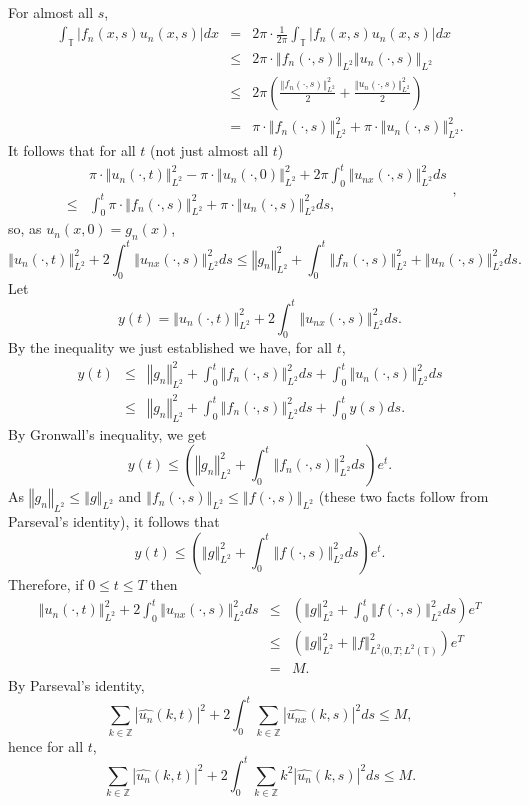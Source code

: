 \documentclass{article}
\newcommand{\norm}[1]{\left\Vert #1 \right\Vert}
\begin{document}
For almost all $s$,
\begin{eqnarray*}
 \int_\mathbb{T} |f_n(x,s) u_n(x,s)| dx &=& 
 2\pi \cdot \frac{1}{2\pi}  \int_\mathbb{T} |f_n(x,s) u_n(x,s)| dx\\
 & \leq& 
 2\pi \cdot \norm{f_n(\cdot,s)}_{L^2} \norm{u_n(\cdot,s)}_{L^2}\\
 &\leq&2\pi \left( \frac{ \norm{f_n(\cdot,s)}_{L^2}^2}{2} + \frac{\norm{u_n(\cdot,s)}_{L^2}^2}{2} \right)\\
 &=&\pi \cdot  \norm{f_n(\cdot,s)}_{L^2}^2 + \pi\cdot \norm{u_n(\cdot,s)}_{L^2}^2.
\end{eqnarray*}
It follows that for all $t$ (not just almost all $t$)
\[
\begin{split}
&\pi \cdot \norm{u_n(\cdot,t)}_{L^2}^2 - \pi \cdot \norm{u_n(\cdot,0)}_{L^2}^2
+ 2\pi \int_0^t \norm{u_{nx}(\cdot,s)}_{L^2}^2 ds\\
 \leq& \int_0^t \pi \cdot  \norm{f_n(\cdot,s)}_{L^2}^2 + \pi\cdot \norm{u_n(\cdot,s)}_{L^2}^2 ds,
 \end{split},
\]
so, as $u_n(x,0)=g_n(x)$,
\[
 \norm{u_n(\cdot,t)}_{L^2}^2+2 \int_0^t \norm{u_{nx}(\cdot,s)}_{L^2}^2 ds \leq  \norm{g_n}_{L^2}^2 +  \int_0^t  \norm{f_n(\cdot,s)}_{L^2}^2  + \norm{u_n(\cdot,s)}_{L^2}^2 ds.
\]
Let
\[
y(t)= \norm{u_n(\cdot,t)}_{L^2}^2+2 \int_0^t \norm{u_{nx}(\cdot,s)}_{L^2}^2 ds.
\]
By the inequality we just established we have, for all $t$,
\begin{eqnarray*}
y(t)& \leq&   \norm{g_n}_{L^2}^2 +  \int_0^t  \norm{f_n(\cdot,s)}_{L^2}^2 ds +\int_0^t \norm{u_n(\cdot,s)}_{L^2}^2 ds\\
&\leq&   \norm{g_n}_{L^2}^2 +  \int_0^t  \norm{f_n(\cdot,s)}_{L^2}^2 ds + \int_0^t y(s) ds.
\end{eqnarray*}
By Gronwall's inequality, we get
\[
 y(t) \leq \left(\norm{g_n}_{L^2}^2 + \int_0^t  \norm{f_n(\cdot,s)}_{L^2}^2 ds \right) e^t.
\]
As $\norm{g_n}_{L^2} \leq \norm{g}_{L^2}$ and $\norm{f_n(\cdot,s)}_{L^2} \leq \norm{f(\cdot,s)}_{L^2}$ (these two
facts follow from Parseval's identity), it follows that
\[
 y(t) \leq \left(\norm{g}_{L^2}^2 + \int_0^t  \norm{f(\cdot,s)}_{L^2}^2 ds \right) e^t.
\]
Therefore,  if $0 \leq t \leq T$ then
\begin{eqnarray*}
\norm{u_n(\cdot,t)}_{L^2}^2+2 \int_0^t \norm{u_{nx}(\cdot,s)}_{L^2}^2 ds& \leq&  \left(\norm{g}_{L^2}^2 + \int_0^t  \norm{f(\cdot,s)}_{L^2}^2 ds \right) e^T\\
&\leq&\left(\norm{g}_{L^2}^2+ \norm{f}_{L^2(0,T;L^2(\mathbb{T})}^2 \right) e^T\\
&=&M.
\end{eqnarray*}
By Parseval's identity,
\[
\sum_{k \in \mathbb{Z}} |\widehat{u_n}(k,t)|^2+2\int_0^t \sum_{k \in \mathbb{Z}} |\widehat{u_{nx}}(k,s)|^2 ds \leq M,
\] 
hence for all $t$,
\[
\sum_{k \in \mathbb{Z}} |\widehat{u_n}(k,t)|^2+2\int_0^t \sum_{k \in \mathbb{Z}} k^2 |\widehat{u_n}(k,s)|^2 ds \leq M.
\]
\end{document}
